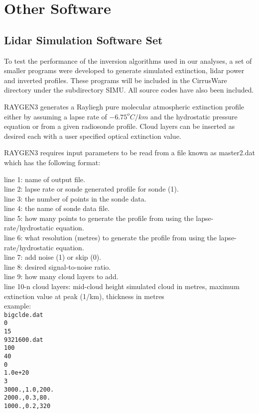 \chapter{Other Software}
\section{Lidar Simulation Software Set}

To test the performance of the inversion algorithms used in our
analyses, a set of smaller programs were developed to generate
simulated extinction, lidar power and inverted profiles.
These programs will be included in the CirrusWare directory under
the subdirectory SIMU. All source codes have also been included.

RAYGEN3 generates a Rayliegh pure molecular atmospheric extinction 
profile either by assuming a lapse rate of ${-6.75^{o}}{C/km}$ and 
the hydrostatic pressure equation or from a given radiosonde profile.
Cloud layers can be inserted as desired each with a user specified
optical extinction value.

RAYGEN3 requires input parameters to be read from a file
known as master2.dat which has the following format:


\noindent
line 1: name of output file.\\
line 2: lapse rate or sonde generated profile for sonde (1).\\
line 3: the number of points in the sonde data.\\ 
line 4: the name of sonde data file.\\ 
line 5: how many points to generate the profile from 
        using the lapse-rate/hydrostatic equation.\\
line 6: what resolution (metres) to generate the profile from 
        using the lapse-rate/hydrostatic equation.\\
line 7: add noise (1) or skip (0).\\
line 8: desired signal-to-noise ratio.\\
line 9: how many cloud layers to add.\\
line 10-n cloud layers: mid-cloud height simulated cloud in metres, maximum
                        extinction value at peak (1/km), thickness in metres\\


\noindent
example:\\
\noindent
{\tt bigclde.dat\\
0\\
15\\
9321600.dat\\
100\\
40\\
0\\
1.0e+20\\
3\\
3000.,1.0,200.\\
2000.,0.3,80.\\
1000.,0.2,320\\
}


